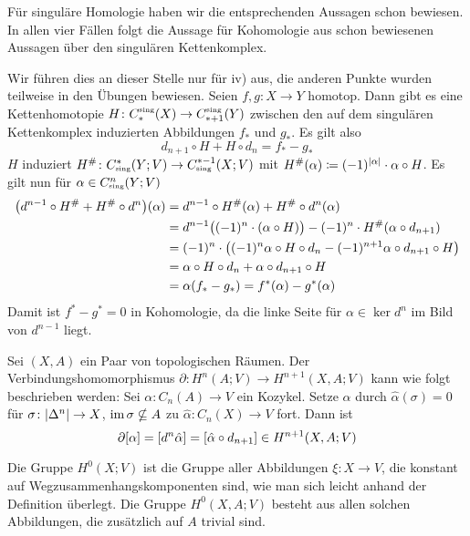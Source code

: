 \begin{beweis}
	Für singuläre Homologie haben wir die entsprechenden Aussagen schon bewiesen. 
	In allen vier Fällen folgt die Aussage für Kohomologie aus schon bewiesenen Aussagen über den singulären Kettenkomplex.
	
	Wir führen dies an dieser Stelle nur für iv) aus, die anderen Punkte wurden teilweise in den Übungen bewiesen. 
	Seien $f, g \colon X \to Y$ homotop. 
	Dann gibt es eine Kettenhomotopie $H \colon C^\sing_*(X) \to C^\sing_{*+1}(Y)$ zwischen den auf dem singulären Kettenkomplex induzierten Abbildungen $f_*$ und $g_*$. Es gilt also
	\[
		d_{n+1} \circ H + H \circ d_n = f_* - g_*
	\]
	$H$ induziert $H^\# \colon C^*_\sing(Y;V) \to C_\sing^{*-1}(X;V)$ mit $H^\#(\alpha) \coloneqq (-1)^{\abs{\alpha}} \cdot \alpha \circ H$. 
	Es gilt nun für $\alpha \in C_\sing^n(Y;V)$
	\begin{align}
		\enbrace*{d^{n-1} \circ H^\# + H^\# \circ d^n}(\alpha) &= d^{n-1} \circ H^\#(\alpha) + H^\# \circ d^n (\alpha)\\
		&= d^{n-1} \enbrace[\big]{(-1)^n \cdot (\alpha \circ H)} - (-1)^n \cdot H^\# \enbrace*{\alpha \circ d_{n+1}} \\
		&= (-1)^n \cdot \enbrace*{(-1)^{n} \alpha \circ H  \circ d_n - (-1)^{n+1} \alpha \circ d_{n+1} \circ H} \\
		&= \alpha \circ H \circ d_n + \alpha \circ d_{n+1} \circ H \\
		&= \alpha \enbrace*{f_* - g_*} = f^*(\alpha) - g^*(\alpha) 
	\end{align}
	Damit ist $f^* - g^* =0$ in Kohomologie, da die linke Seite für $\alpha \in \ker d^n$ im Bild von $d^{n-1}$ liegt.
\end{beweis}

\begin{bemerkung}[{name=[Angabe des Verbindungshomomorphismus]},label=bem:verbindungshomo]
	Sei $(X,A)$ ein Paar von topologischen Räumen. Der Verbindungshomomorphismus $\partial \colon H^n(A;V) \to H^{n+1}(X,A;V)$ kann wie folgt beschrieben werden: Sei 
	$\alpha \colon C_n(A) \to V$ ein Kozykel. Setze $\alpha$  durch $\hat{\alpha}(\sigma)=0$ für $\sigma \colon \abs{\Delta^n} \to X$, $\im \sigma \nsubseteq A$ zu 
	$\hat{\alpha} \colon C_n(X) \to V$ fort. Dann ist 
	\[
		\partial \benbrace{\alpha} = \benbrace*{d^n \hat{\alpha}} = \benbrace*{\hat{\alpha} \circ d_{n+1}} \in H^{n+1}(X,A;V)
	\]
\end{bemerkung}

\begin{beispiel}[{name=[$0$-te Kohomologie]},label=0teKoho]
	Die Gruppe $H^0(X;V)$ ist die Gruppe aller Abbildungen $\xi \colon X \to V$, die konstant auf Wegzusammenhangskomponenten sind, wie man sich leicht anhand der Definition überlegt. 
	Die Gruppe $H^0(X,A;V)$ besteht aus allen solchen Abbildungen, die zusätzlich auf $A$ trivial sind.
\end{beispiel}

